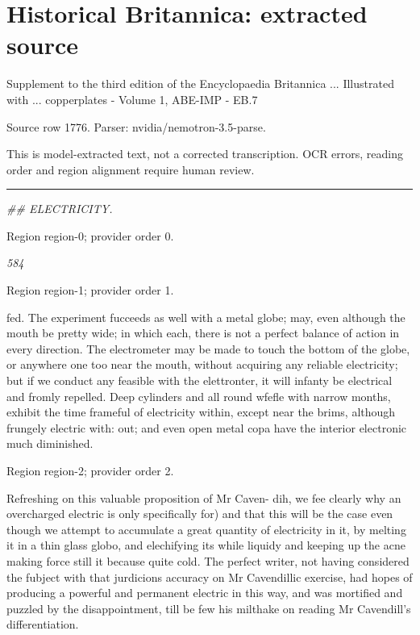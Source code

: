 \documentclass[11pt]{article}
\begin{document}
\section*{Historical Britannica: extracted source}
Supplement to the third edition of the Encyclopaedia Britannica ... Illustrated with ... copperplates - Volume 1, ABE-IMP - EB.7\par
{\small Source row 1776. Parser: nvidia/nemotron-3.5-parse.\par}
{\small This is model-extracted text, not a corrected transcription. OCR errors, reading order and region alignment require human review.\par}
\hrule\medskip
{\small\itshape \#\# ELECTRICITY.\par}

{\scriptsize\color{gray} Region region-0; provider order 0.\par}
\medskip

{\small\itshape 584\par}

{\scriptsize\color{gray} Region region-1; provider order 1.\par}
\medskip

fed. The experiment fucceeds as well with a metal globe; may, even although the mouth be pretty wide; in which each, there is not a perfect balance of action in every direction. The electrometer may be made to touch the bottom of the globe, or anywhere one too near the mouth, without acquiring any reliable electricity; but if we conduct any feasible with the elettronter, it will infanty be electrical and fromly repelled. Deep cylinders and all round wfefle with narrow months, exhibit the time frameful of electricity within, except near the brims, although frungely electric with: out; and even open metal copa have the interior electronic much diminished.
\par

{\scriptsize\color{gray} Region region-2; provider order 2.\par}
\medskip

Refreshing on this valuable proposition of Mr Caven- dih, we fee clearly why an overcharged electric is only specifically for) and that this will be the case even though we attempt to accumulate a great quantity of electricity in it, by melting it in a thin glass globo, and elechifying its while liquidy and keeping up the acne making force still it because quite cold. The perfect writer, not having considered the fubject with that jurdicions accuracy on Mr Cavendillic exercise, had hopes of producing a powerful and permanent electric in this way, and was mortified and puzzled by the disappointment, till be few his milthake on reading Mr Cavendill’s differentiation.
\par
\end{document}
